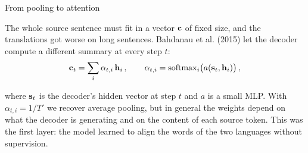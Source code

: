 \begin{frame}{From pooling to attention}
    \setlength{\parskip}{6pt}

    The whole source sentence must fit in a vector $\vc{c}$ of fixed size, and
    the translations got worse on long sentences.
    Bahdanau et al. (2015) let the decoder compute a different summary at every
    step $t$:
    \[
        \vc{c}_t=\sum_{i}\eqnmarkbox[drawblue]{alpha}{\alpha_{t,i}}\,\vc{h}_i\,,
        \qquad
        \alpha_{t,i}=\operatorname{softmax}_i\bigl(a(\vc{s}_t,\vc{h}_i)\bigr)\,,
    \]
    \vspace{0.6em}

    where $\vc{s}_t$ is the decoder's hidden vector at step $t$ and $a$ is a small
    MLP. With $\alpha_{t,i}=1/T'$ we recover average pooling, but in general the
    weights depend on what the decoder is generating and on the content of each
    source token. This was the first  layer: the model learned
    to align the words of the two languages without supervision.


\end{frame}

